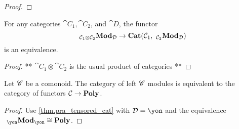 \documentclass[Book-Poly]{subfiles}
\begin{document}
\begin{proof}
    
\end{proof}


\begin{corollary}\label{cor.tensored}
For any categories $\cat{C}_1, \cat{C}_2$, and $\cat{D}$, the functor
\[
    ~_{\mathcal{C}_1 \otimes \mathcal{C}_2}\textbf{Mod}_{\mathcal{D}} \to \textbf{Cat}(\mathcal{C}_1, ~_{\mathcal{C}_2}\textbf{Mod}_{\mathcal{D}})
\]
is an equivalence.
\end{corollary}
\begin{proof}
** $\cat{C}_1 \otimes \cat{C}_2$ is the usual product of categories **
\end{proof}


\begin{corollary}
Let $\mathscr{C}$ be a comonoid. The category of left $\mathscr{C}$ modules is equivalent to the category of functors $\mathcal{C}\to\textbf{Poly}$.
\end{corollary}
\begin{proof}
Use \cref{thm.pra_tensored_cat} with $\cat{D} = \yon$ and the equivalence $\bimod{\yon}{\yon} \cong \poly$.
\end{proof}

\end{document}
